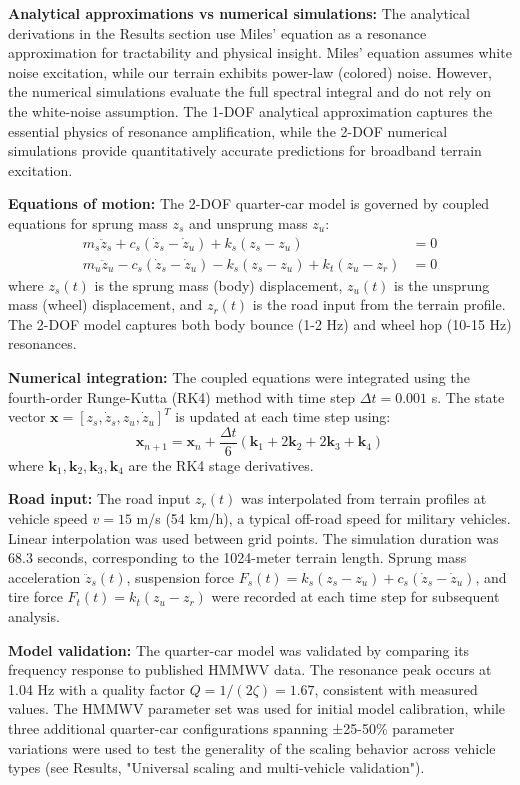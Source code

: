 \documentclass[11pt,letterpaper]{article}
\begin{document}
\textbf{Analytical approximations vs numerical simulations:} The analytical derivations in the Results section use Miles' equation as a resonance approximation for tractability and physical insight. Miles' equation assumes white noise excitation, while our terrain exhibits power-law (colored) noise. However, the numerical simulations evaluate the full spectral integral and do not rely on the white-noise assumption. The 1-DOF analytical approximation captures the essential physics of resonance amplification, while the 2-DOF numerical simulations provide quantitatively accurate predictions for broadband terrain excitation.

\textbf{Equations of motion:} The 2-DOF quarter-car model is governed by coupled equations for sprung mass $z_s$ and unsprung mass $z_u$:
\begin{align}
m_s \ddot{z}_s + c_s (\dot{z}_s - \dot{z}_u) + k_s (z_s - z_u) &= 0 \\
m_u \ddot{z}_u - c_s (\dot{z}_s - \dot{z}_u) - k_s (z_s - z_u) + k_t (z_u - z_r) &= 0
\end{align}
where $z_s(t)$ is the sprung mass (body) displacement, $z_u(t)$ is the unsprung mass (wheel) displacement, and $z_r(t)$ is the road input from the terrain profile. The 2-DOF model captures both body bounce (1-2 Hz) and wheel hop (10-15 Hz) resonances.

\textbf{Numerical integration:} The coupled equations were integrated using the fourth-order Runge-Kutta (RK4) method with time step $\Delta t = 0.001$ s. The state vector $\mathbf{x} = [z_s, \dot{z}_s, z_u, \dot{z}_u]^T$ is updated at each time step using:
\begin{equation}
\mathbf{x}_{n+1} = \mathbf{x}_n + \frac{\Delta t}{6}(\mathbf{k}_1 + 2\mathbf{k}_2 + 2\mathbf{k}_3 + \mathbf{k}_4)
\end{equation}
where $\mathbf{k}_1, \mathbf{k}_2, \mathbf{k}_3, \mathbf{k}_4$ are the RK4 stage derivatives.

\textbf{Road input:} The road input $z_r(t)$ was interpolated from terrain profiles at vehicle speed $v = 15$ m/s (54 km/h), a typical off-road speed for military vehicles. Linear interpolation was used between grid points. The simulation duration was 68.3 seconds, corresponding to the 1024-meter terrain length. Sprung mass acceleration $\ddot{z}_s(t)$, suspension force $F_s(t) = k_s(z_s - z_u) + c_s(\dot{z}_s - \dot{z}_u)$, and tire force $F_t(t) = k_t(z_u - z_r)$ were recorded at each time step for subsequent analysis.

\textbf{Model validation:} The quarter-car model was validated by comparing its frequency response to published HMMWV data. The resonance peak occurs at 1.04 Hz with a quality factor $Q = 1/(2\zeta) = 1.67$, consistent with measured values. The HMMWV parameter set was used for initial model calibration, while three additional quarter-car configurations spanning ±25-50\% parameter variations were used to test the generality of the scaling behavior across vehicle types (see Results, "Universal scaling and multi-vehicle validation").
\end{document}
